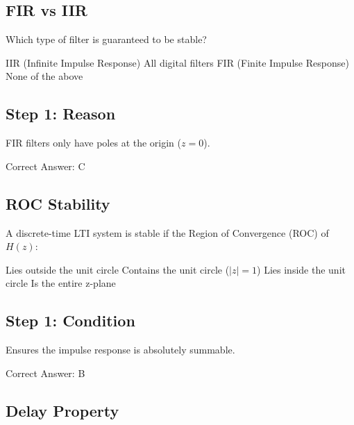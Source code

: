 \clearpage

\subsection{FIR vs IIR}

Which type of filter is guaranteed to be stable?

\begin{choices}
    \choice IIR (Infinite Impulse Response)
    \choice All digital filters
    \correctchoice FIR (Finite Impulse Response)
    \choice None of the above
\end{choices}

\begin{solution}

\subsection*{Step 1: Reason}
FIR filters only have poles at the origin ($z=0$).

Correct Answer: C
\end{solution}

\clearpage

\subsection{ROC Stability}

A discrete-time LTI system is stable if the Region of Convergence (ROC) of $H(z)$:

\begin{choices}
    \choice Lies outside the unit circle
    \correctchoice Contains the unit circle ($|z|=1$)
    \choice Lies inside the unit circle
    \choice Is the entire z-plane
\end{choices}

\begin{solution}

\subsection*{Step 1: Condition}
Ensures the impulse response is absolutely summable.

Correct Answer: B
\end{solution}

\clearpage

\subsection{Delay Property}

